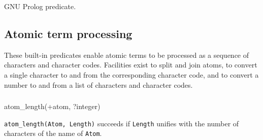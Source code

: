 \begin{PlErrors}






\end{PlErrors}

\Portability

GNU Prolog predicate.

\subsection{Atomic term processing}
These built-in predicates enable atomic terms to be processed as a sequence
of characters and character codes. Facilities exist to split and join atoms,
to convert a single character to and from the corresponding character code,
and to convert a number to and from a list of characters and character
codes.

\subsubsection{}

\begin{TemplatesOneCol}
atom\_length(+atom, ?integer)

\end{TemplatesOneCol}

\Description

\texttt{atom\_length(Atom, Length)} succeeds if \texttt{Length} unifies with
the number of characters of the name of \texttt{Atom}.

\begin{PlErrors}





\end{PlErrors}

